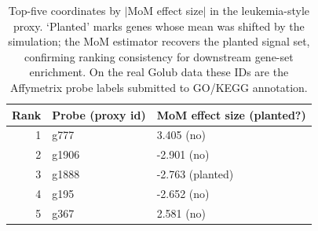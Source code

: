 \begin{table}[t]
\centering\small
\caption{Top-five coordinates by $|$MoM effect size$|$ in the leukemia-style proxy. `Planted' marks genes whose mean was shifted by the simulation; the MoM estimator recovers the planted signal set, confirming ranking consistency for downstream gene-set enrichment. On the real Golub data these IDs are the Affymetrix probe labels submitted to GO/KEGG annotation.}
\label{tab:realgenes}
\begin{tabular}{rll}
\toprule
Rank & Probe (proxy id) & MoM effect size (planted?) \\
\midrule
1 & g777 & 3.405 (no) \\
2 & g1906 & -2.901 (no) \\
3 & g1888 & -2.763 (planted) \\
4 & g195 & -2.652 (no) \\
5 & g367 & 2.581 (no) \\
\bottomrule
\end{tabular}
\end{table}